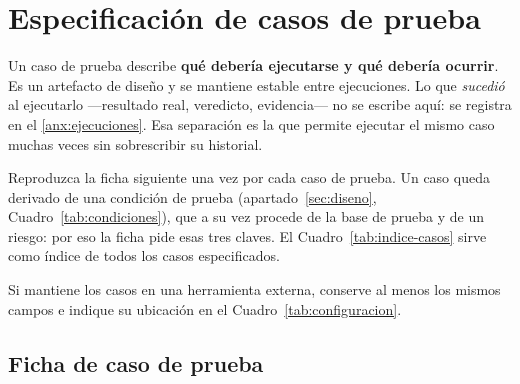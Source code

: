 \section{Especificación de casos de prueba}
\label{anx:casos}

\begin{notanormativa}
Un caso de prueba describe \textbf{qué debería ejecutarse y qué debería ocurrir}. Es un
artefacto de diseño y se mantiene estable entre ejecuciones. Lo que \emph{sucedió} al ejecutarlo
—resultado real, veredicto, evidencia— no se escribe aquí: se registra en el
\ref{anx:ejecuciones}. Esa separación es la que permite ejecutar el mismo caso muchas veces sin
sobrescribir su historial.
\end{notanormativa}

\begin{instruccion}
Reproduzca la ficha siguiente una vez por cada caso de prueba. Un caso queda derivado de una
condición de prueba (apartado~\ref{sec:diseno}, Cuadro~\ref{tab:condiciones}), que a su vez
procede de la base de prueba y
de un riesgo: por eso la ficha pide esas tres claves. El Cuadro~\ref{tab:indice-casos} sirve
como índice de todos los casos especificados.

Si mantiene los casos en una herramienta externa, conserve al menos los mismos campos e indique
su ubicación en el Cuadro~\ref{tab:configuracion}.
\end{instruccion}

\begin{observacion}
\end{observacion}

\subsection*{Ficha de caso de prueba}

